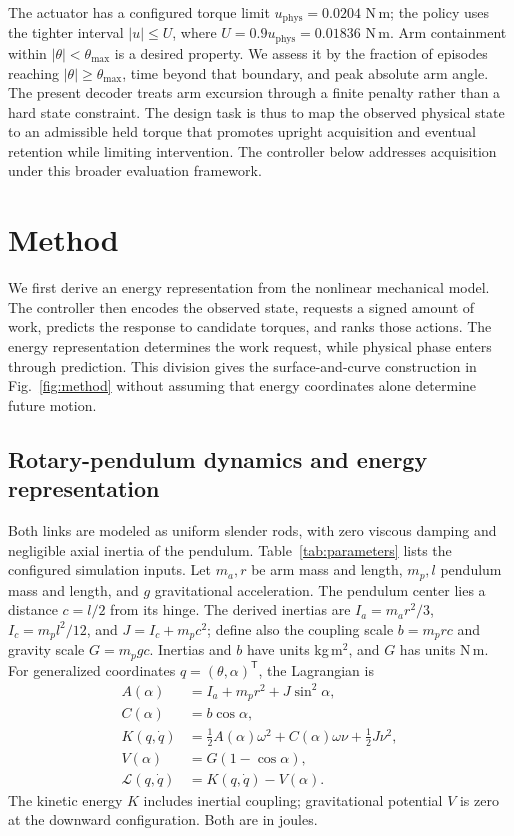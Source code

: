 \documentclass[letterpaper,10pt,conference]{ieeeconf}
\begin{document}
The actuator has a configured torque limit $u_{\mathrm{phys}}=0.0204$ N\,m; the policy uses the tighter interval $|u|\leq U$, where $U=0.9u_{\mathrm{phys}}=0.01836$ N\,m. Arm containment within $|\theta|<\theta_{\max}$ is a desired property. We assess it by the fraction of episodes reaching $|\theta|\geq\theta_{\max}$, time beyond that boundary, and peak absolute arm angle. The present decoder treats arm excursion through a finite penalty rather than a hard state constraint. The design task is thus to map the observed physical state to an admissible held torque that promotes upright acquisition and eventual retention while limiting intervention. The controller below addresses acquisition under this broader evaluation framework.

\section{Method}
We first derive an energy representation from the nonlinear mechanical model. The controller then encodes the observed state, requests a signed amount of work, predicts the response to candidate torques, and ranks those actions. The energy representation determines the work request, while physical phase enters through prediction. This division gives the surface-and-curve construction in Fig.~\ref{fig:method} without assuming that energy coordinates alone determine future motion.

\subsection{Rotary-pendulum dynamics and energy representation}
Both links are modeled as uniform slender rods, with zero viscous damping and negligible axial inertia of the pendulum. Table~\ref{tab:parameters} lists the configured simulation inputs. Let $m_a,r$ be arm mass and length, $m_p,l$ pendulum mass and length, and $g$ gravitational acceleration. The pendulum center lies a distance $c=l/2$ from its hinge. The derived inertias are $I_a=m_a r^2/3$, $I_c=m_p l^2/12$, and $J=I_c+m_p c^2$; define also the coupling scale $b=m_p r c$ and gravity scale $G=m_p g c$. Inertias and $b$ have units kg\,m$^2$, and $G$ has units N\,m. For generalized coordinates $q=(\theta,\alpha)^{\mathsf T}$, the Lagrangian is
\begin{equation}
\begin{aligned}
 A(\alpha)&=I_a+m_p r^2+J\sin^2\alpha,\\
 C(\alpha)&=b\cos\alpha,\\
 K(q,\dot q)&=\tfrac12 A(\alpha)\omega^2+C(\alpha)\omega\nu
                  +\tfrac12 J\nu^2,\\
 V(\alpha)&=G(1-\cos\alpha),\\
 \mathcal L(q,\dot q)&=K(q,\dot q)-V(\alpha).
\end{aligned}
\label{eq:lagrangian}
\end{equation}
The kinetic energy $K$ includes inertial coupling; gravitational potential $V$ is zero at the downward configuration. Both are in joules.
\end{document}
